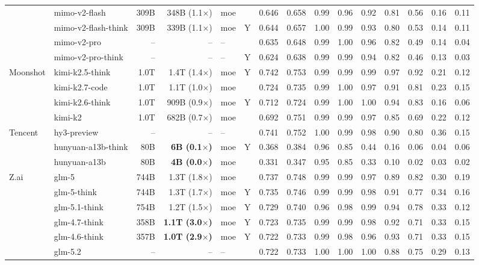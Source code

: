\begin{longtable}{@{}ll r r l c rr rrrrrrr@{}}
 & mimo-v2-flash & 309B & 348B (1.1$\times$) & moe &  & 0.646 & 0.658 & 0.99 & 0.96 & 0.92 & 0.81 & 0.56 & 0.16 & 0.11 \\
 & mimo-v2-flash-think & 309B & 339B (1.1$\times$) & moe & Y & 0.644 & 0.657 & 1.00 & 0.99 & 0.93 & 0.80 & 0.53 & 0.14 & 0.11 \\
 & mimo-v2-pro & -- & -- & -- &  & 0.635 & 0.648 & 0.99 & 1.00 & 0.96 & 0.82 & 0.49 & 0.14 & 0.04 \\
 & mimo-v2-pro-think & -- & -- & -- & Y & 0.624 & 0.638 & 0.99 & 0.99 & 0.94 & 0.82 & 0.46 & 0.13 & 0.03 \\
Moonshot & kimi-k2.5-think & 1.0T & 1.4T (1.4$\times$) & moe & Y & 0.742 & 0.753 & 0.99 & 0.99 & 0.99 & 0.97 & 0.92 & 0.21 & 0.12 \\
 & kimi-k2.7-code & 1.0T & 1.1T (1.0$\times$) & moe &  & 0.724 & 0.735 & 0.99 & 1.00 & 0.97 & 0.91 & 0.81 & 0.23 & 0.15 \\
 & kimi-k2.6-think & 1.0T & 909B (0.9$\times$) & moe & Y & 0.712 & 0.724 & 0.99 & 1.00 & 1.00 & 0.94 & 0.83 & 0.16 & 0.06 \\
 & kimi-k2 & 1.0T & 682B (0.7$\times$) & moe &  & 0.692 & 0.751 & 0.99 & 0.99 & 0.97 & 0.85 & 0.69 & 0.22 & 0.12 \\
Tencent & hy3-preview & -- & -- & -- &  & 0.741 & 0.752 & 1.00 & 0.99 & 0.98 & 0.90 & 0.80 & 0.36 & 0.15 \\
 & hunyuan-a13b-think & 80B & \textbf{6B (0.1$\times$)} & moe & Y & 0.368 & 0.384 & 0.96 & 0.85 & 0.44 & 0.16 & 0.06 & 0.04 & 0.06 \\
 & hunyuan-a13b & 80B & \textbf{4B (0.0$\times$)} & moe &  & 0.331 & 0.347 & 0.95 & 0.85 & 0.33 & 0.10 & 0.02 & 0.03 & 0.02 \\
Z.ai & glm-5 & 744B & 1.3T (1.8$\times$) & moe &  & 0.737 & 0.748 & 0.99 & 0.99 & 0.97 & 0.89 & 0.82 & 0.30 & 0.19 \\
 & glm-5-think & 744B & 1.3T (1.7$\times$) & moe & Y & 0.735 & 0.746 & 0.99 & 0.99 & 0.98 & 0.91 & 0.77 & 0.34 & 0.16 \\
 & glm-5.1-think & 754B & 1.2T (1.5$\times$) & moe & Y & 0.729 & 0.740 & 0.96 & 0.98 & 0.99 & 0.94 & 0.78 & 0.33 & 0.12 \\
 & glm-4.7-think & 358B & \textbf{1.1T (3.0$\times$)} & moe & Y & 0.723 & 0.735 & 0.99 & 0.99 & 0.98 & 0.92 & 0.71 & 0.33 & 0.15 \\
 & glm-4.6-think & 357B & \textbf{1.0T (2.9$\times$)} & moe & Y & 0.722 & 0.733 & 0.99 & 0.98 & 0.96 & 0.93 & 0.71 & 0.33 & 0.15 \\
 & glm-5.2 & -- & -- & -- &  & 0.722 & 0.733 & 1.00 & 1.00 & 1.00 & 0.88 & 0.75 & 0.29 & 0.13 \\

\end{longtable}
